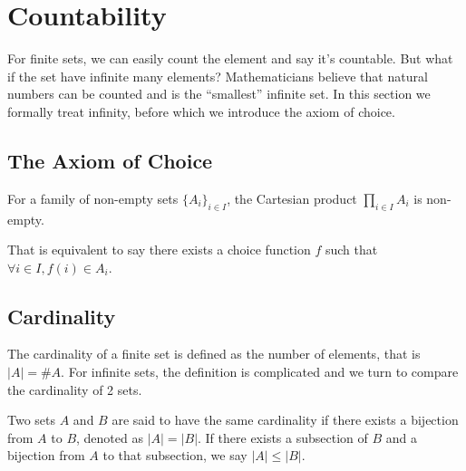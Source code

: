 \section{Countability}
For finite sets, we can easily count the element and say it's countable. But what if the set have infinite many elements?
Mathematicians believe that natural numbers can be counted and is the ``smallest'' infinite set. In this section we formally treat infinity, before which we introduce the axiom of choice.
\subsection{The Axiom of Choice}
\begin{axiom} 
    For a family of non-empty sets $\{A_i\}_{i\in I}$, the Cartesian product $\prod_{i\in I} A_i$ is non-empty.
\end{axiom}

That is equivalent to say there exists a choice function $f$ such that $\forall i \in I, f(i) \in A_i.$ 

\subsection{Cardinality}
The cardinality of a finite set is defined as the number of elements, that is $|A|=\# A$. For infinite sets, the definition is complicated and we turn to compare the cardinality
of 2 sets.
\begin{definition}
    Two sets $A$ and $B$ are said to have the same cardinality if there exists a bijection from $A$ to $B$, denoted as $|A|=|B|$. 
    If there exists a subsection of $B$ and a bijection from $A$ to that subsection, we say $|A|\leq |B|$.
\end{definition}

